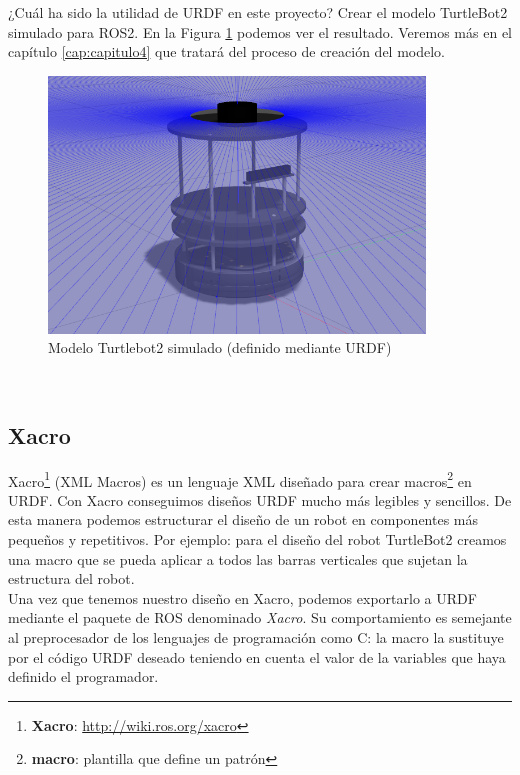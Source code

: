 ¿Cuál ha sido la utilidad de URDF en este proyecto? Crear el modelo TurtleBot2 simulado para ROS2. En la Figura \ref{fig:modelo_turtlebot2_simulado} podemos ver el resultado. Veremos más en el capítulo \ref{cap:capitulo4} que tratará del proceso de creación del modelo.
\begin{figure} [H]
  \begin{center}
    \includegraphics[width=10cm]{imagenes/cap3/turtlebot2-sim.png}
  \end{center}
  \caption{Modelo Turtlebot2 simulado (definido mediante URDF)}
  \label{fig:modelo_turtlebot2_simulado}
\end{figure}\




\subsection{Xacro}
\label{subsec:xacro}

Xacro\footnote{\textbf{Xacro}: \url{http://wiki.ros.org/xacro}} (XML Macros) es un lenguaje XML diseñado para crear macros\footnote{\textbf{macro}: plantilla que define un patrón} en URDF. Con Xacro conseguimos diseños URDF mucho más legibles y sencillos. De esta manera podemos estructurar el diseño de un robot en componentes más pequeños y repetitivos. Por ejemplo: para el diseño del robot TurtleBot2 creamos una macro que se pueda aplicar a todos las barras verticales que sujetan la estructura del robot.\\

Una vez que tenemos nuestro diseño en Xacro, podemos exportarlo a URDF mediante el paquete de ROS denominado \textit{Xacro}. Su comportamiento es semejante al preprocesador de los lenguajes de programación como C: la macro la sustituye por el código URDF deseado teniendo en cuenta el valor de la variables que haya definido el programador.\\

